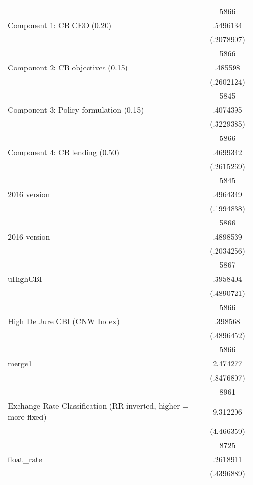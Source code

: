 {\begin{longtable}{l*{1}{c}}
                    &        5866\\
Component 1: CB CEO (0.20)&    .5496134\\
                    &  (.2078907)\\
                    &        5866\\
Component 2: CB objectives (0.15)&     .485598\\
                    &  (.2602124)\\
                    &        5845\\
Component 3: Policy formulation (0.15)&    .4074395\\
                    &  (.3229385)\\
                    &        5866\\
Component 4: CB lending (0.50)&    .4699342\\
                    &  (.2615269)\\
                    &        5845\\
2016 version        &    .4964349\\
                    &  (.1994838)\\
                    &        5866\\
2016 version        &    .4898539\\
                    &  (.2034256)\\
                    &        5867\\
uHighCBI            &    .3958404\\
                    &  (.4890721)\\
                    &        5866\\
High De Jure CBI (CNW Index)&     .398568\\
                    &  (.4896452)\\
                    &        5866\\
merge1              &    2.474277\\
                    &  (.8476807)\\
                    &        8961\\
Exchange Rate Classification (RR inverted, higher = more fixed)&    9.312206\\
                    &  (4.466359)\\
                    &        8725\\
float\_rate          &    .2618911\\
                    &  (.4396889)\\

\end{longtable}}
